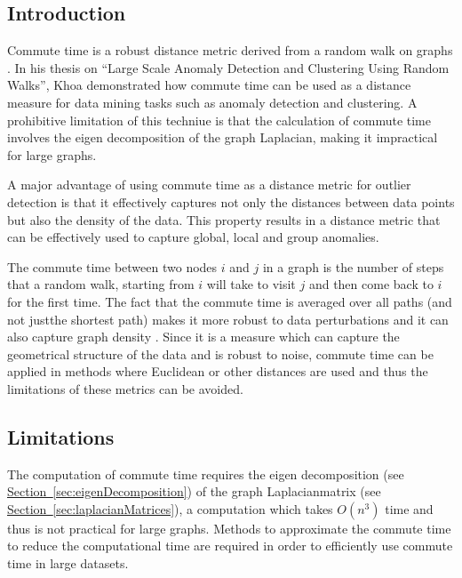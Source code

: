 \subsection{Introduction}
\label{sec:commuteTime:introduction}
Commute time is a robust distance metric derived from a random walk on graphs 
\cite{Khoa:2012}. In his thesis on ``Large Scale Anomaly Detection and 
Clustering Using Random Walks'', Khoa demonstrated how commute time can be used 
as a distance measure for data mining tasks such as anomaly detection and 
clustering. A prohibitive limitation of this techniue is that the calculation of
commute time involves the eigen decomposition of the graph Laplacian, making it 
impractical for large graphs.

A major advantage of using commute time as a distance metric for outlier 
detection is that it effectively captures not only the distances between data 
points but also the density of the data. This property results in a distance 
metric that can be effectively used to capture global, local and group 
anomalies.

The commute time between two nodes $i$ and $j$ in a graph is the number of steps
that a random walk, starting from $i$ will take to visit $j$ and then come back 
to $i$ for the first time. The fact that the commute time is averaged over all 
paths (and not justthe shortest path) makes it more robust to data perturbations
and it can also capture graph density \cite{Khoa:2012}. Since it is a measure 
which can capture the geometrical structure of the data and is robust to noise, 
commute time can be applied in methods where Euclidean or other distances are 
used and thus the limitations of these metrics can be avoided.

\subsection{Limitations}
\label{sec:commuteTime:limitations}
The computation of commute time requires the eigen decomposition (see 
\hyperref[sec:eigenDecomposition] {Section~\ref{sec:eigenDecomposition}}) of the
graph Laplacianmatrix (see \hyperref[sec:laplacianMatrices] 
{Section~\ref{sec:laplacianMatrices}}), a computation which takes $O(n^{3})$ 
time and thus is not practical for large graphs. Methods to approximate the 
commute time to reduce the computational time are required in order to 
efficiently use commute time in large datasets.

